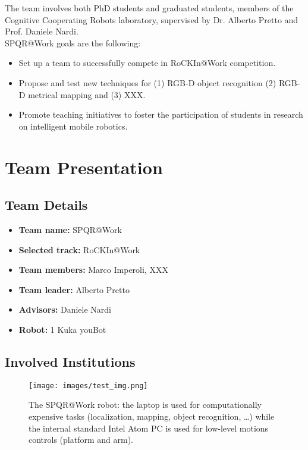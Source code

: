 \documentclass[conference]{IEEEtran}
\begin{document}
The team involves both PhD students and graduated students, members of the Cognitive Cooperating Robots laboratory, supervised by Dr. Alberto Pretto and Prof. Daniele Nardi.\\ 

SPQR@Work goals are the following:
\begin{itemize}
 \item Set up a team to successfully compete in RoCKIn@Work competition.
 \item Propose and test new techniques for (1) RGB-D object recognition  (2) RGB-D metrical mapping and (3) XXX.
 \item Promote teaching initiatives to foster the participation of students in research on intelligent mobile robotics.
\end{itemize}
 
\section{Team Presentation}
\subsection{Team Details}

\begin{itemize}
 \item \textbf{Team name:} SPQR@Work
 \item \textbf{Selected track:} RoCKIn@Work
 \item \textbf{Team members:} Marco Imperoli, XXX
  \item \textbf{Team leader:} Alberto Pretto
 \item \textbf{Advisors:} Daniele Nardi
 \item \textbf{Robot:} 1 Kuka youBot
\end{itemize}

\subsection{Involved Institutions}
\begin{figure}[t!]
\begin{center}
\texttt{[image: images/test\_img.png]}
\end{center}
\caption{The SPQR@Work robot: the laptop is used for computationally expensive tasks (localization, mapping, object recognition, \dots) while the internal standard Intel Atom PC is used for low-level motions controls (platform and arm).}\label{fig:robot}
\end{figure}
\end{document}
